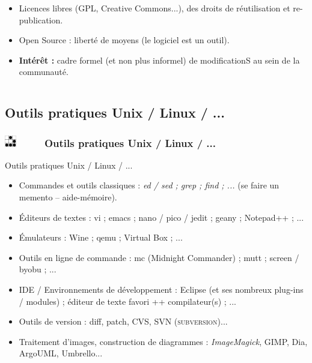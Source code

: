 \documentclass[slidetop,11pt]{beamer}
\def\sectionPartIVb{Outils pratiques Unix / Linux / ...}
\def\moreInFrameTitle{\includegraphics[height=0.5cm]{img/logo_glider.png}~~~~~}
\begin{document}
\begin{frame}
\begin{footnotesize}
\begin{columns}[T]
\begin{column}[T]{7cm}
\begin{beamerboxesrounded}	[lower=substructureDE, %
		 				 upper=block title DE,%
						 shadow=true]
\begin{itemize}
\begin{enumerate}
					\item La libert{\'e} de redistribuer des copies (ou assimil{\'e} : cultures, lign{\'e}es). 
					\item La libert{\'e} d'am{\'e}liorer et de publier ces am{\'e}liorations pour la communaut{\'e}. 
				\end{enumerate}
				\item Licences libres (GPL, Creative Commons...), des droits de r{\'e}utilisation et re-publication. 
				\item Open Source : libert{\'e} de moyens (le logiciel est un outil). 
				\item \textbf{Int{\'e}r{\^e}t : } cadre formel (et non plus informel) de modificationS au sein de la communaut{\'e}. 
			\end{itemize}
		\end{beamerboxesrounded}
	\end{column}
	\end{columns}
	\end{footnotesize}
\end{frame}

\subsection{\sectionPartIVb}
\begin{frame}
	\frametitle{\moreInFrameTitle \sectionPartIVb}
	\begin{beamerboxesrounded}	[lower=substructureTR, %
					 upper=block title TR,%
					 shadow=true]%
	       {\sectionPartIVb}
		\begin{itemize}
			\item Commandes et outils classiques : \emph{ed / sed ; grep ; find ; ...} (se faire un memento -- aide-m{\'e}moire). 
			\item {\'E}diteurs de textes : vi ; emacs ; nano / pico / jedit ; geany ; Notepad++ ; ...
			\item {\'E}mulateurs : Wine ; qemu ; Virtual Box ; ...
			\item Outils en ligne de commande : mc (Midnight Commander) ; mutt ; screen / byobu ; ...
			\item IDE / Environnements de d{\'e}veloppement : Eclipse (et ses nombreux plug-ins / modules) ; {\'e}diteur de texte favori ++ compilateur(s) ; ...
			\item Outils de version : diff, patch, CVS, SVN (\textsc{subversion})...
			\item Traitement d'images, construction de diagrammes : \emph{ImageMagick}, GIMP, Dia, ArgoUML, Umbrello...
		\end{itemize}
	\end{beamerboxesrounded}
\end{frame}
\end{document}
